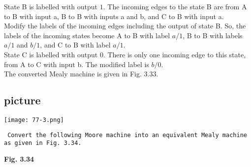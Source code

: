\documentclass[9pt]{beamer}
\begin{document}
\begin{frame}
 State B is labelled with output $1$. The incoming edges
to the state B are from A to B with input a, B to B with
inputs a and b, and C to B with input a.\\
\hspace*{0.2cm} Modify the labels of the incoming edges including
the output of state B. So, the labels of the incoming
states become A to B with label $a/1$, B to B with labels
$a/1$ and $b/1$, and C to B with label $a/1$.\\
 State C is labelled with output $0$. There is only one
incoming edge to this state, from A to C with input b.
The modified label is $b/0$.\\
\hspace*{0.2cm} The converted Mealy machine is given in Fig. 3.33.

\pause
\begin{center}
\section{picture}
\texttt{[image: 77-3.png]}
\end{center}
\end{frame}

\begin{frame}
\hspace*{0.1cm} \texttt{ Convert the following Moore machine into an equivalent Mealy machine as given in
Fig. 3.34.}
\pause
\begin{center}
\end{center}
\begin{center}
\textbf{Fig. 3.34}
\end{center}
\end{frame}
\end{document}
